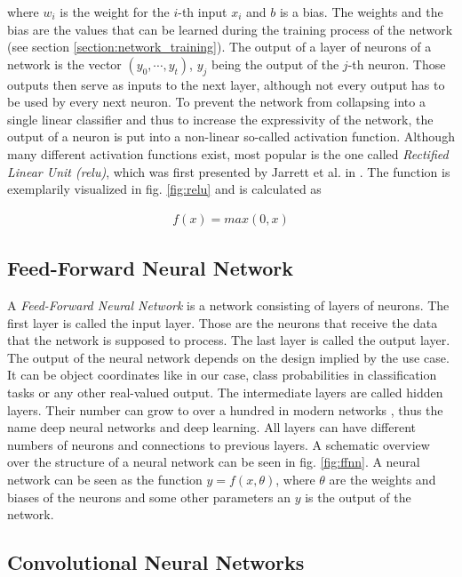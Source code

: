 where $w_i$ is the weight for the $i$-th input $x_i$ and $b$ is a bias. The weights and the bias are the values that can be learned during the training process of the network (see section \ref{section:network_training}). The output of a layer of neurons of a network is the vector $(y_0, \cdots, y_t)$, $y_j$ being the output of the $j$-th neuron. Those outputs then serve as inputs to the next layer, although not every output has to be used by every next neuron. To prevent the network from collapsing into a single linear classifier and thus to increase the expressivity of the network, the output of a neuron is put into a non-linear so-called activation function. Although many different activation functions exist, most popular is the one called \textit{Rectified Linear Unit (\gls{relu})}, which was first presented by Jarrett et al. in \cite{relu}. The function is exemplarily visualized in fig. \ref{fig:relu} and is calculated as

\begin{align}
f(x) = max(0, x)
\end{align} 

\subsection{Feed-Forward Neural Network}

A \textit{Feed-Forward Neural Network} is a network consisting of layers of neurons. The first layer is called the input layer. Those are the neurons that receive the data that the network is supposed to process. The last layer is called the output layer. The output of the neural network depends on the design implied by the use case. It can be object coordinates like in our case, class probabilities in classification tasks or any other real-valued output. The intermediate layers are called hidden layers. Their number can grow to over a hundred in modern networks \cite{resnet}, thus the name deep neural networks and deep learning. All layers can have different numbers of neurons and connections to previous layers. A schematic overview over the structure of a neural network can be seen in fig. \ref{fig:ffnn}. A neural network can be seen as the function $y=f(x,\theta)$, where $\theta$ are the weights and biases of the neurons and some other parameters an $y$ is the output of the network.

\subsection{Convolutional Neural Networks}

